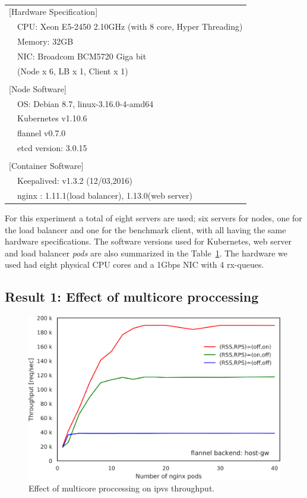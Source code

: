 \begin{table}[]
  \centering
  \begin{tabular}{ll}
    \hline 
    \multicolumn{2}{l}{[Hardware Specification]}   \\
    & CPU: Xeon E5-2450 2.10GHz (with 8 core, Hyper Threading) \\
    & Memory: 32GB \\
    & NIC: Broadcom BCM5720 Giga bit \\
    & (Node x 6, LB x 1, Client x 1) \\
    & \\
    \multicolumn{2}{l}{[Node Software]}  \\
    & OS: Debian 8.7, linux-3.16.0-4-amd64 \\
    & Kubernetes v1.10.6 \\
    & flannel v0.7.0 \\
    & etcd version: 3.0.15 \\
    & \\
    \multicolumn{2}{l}{[Container Software]}   \\
    & Keepalived: v1.3.2 (12/03,2016) \\
    & nginx : 1.11.1(load balancer), 1.13.0(web server) \\
    \hline
  \end{tabular}
  \caption{}
  \label{tab:hw_sw_spec}
\end{table}

For this experiment a total of eight servers are used; six servers for nodes, one for the load balancer and one for the benchmark client, with all having the same hardware specifications.
The software versions used for Kubernetes, web server and load balancer {\em pods} are also summarized in the Table~\ref{tab:hw_sw_spec}.
The hardware we used had eight physical CPU cores and a 1Gbps NIC with 4 rx-queues.

\subsection{Result 1: Effect of multicore proccessing}

\begin{figure}
  \centering
  \includegraphics[width=0.8\columnwidth]{Figs/ipvs_mcore_proccessing}
  \caption{Effect of multicore proccessing on ipvs throughput.}
  \label{fig:ipvs_mcore_proccessing}
\end{figure}

